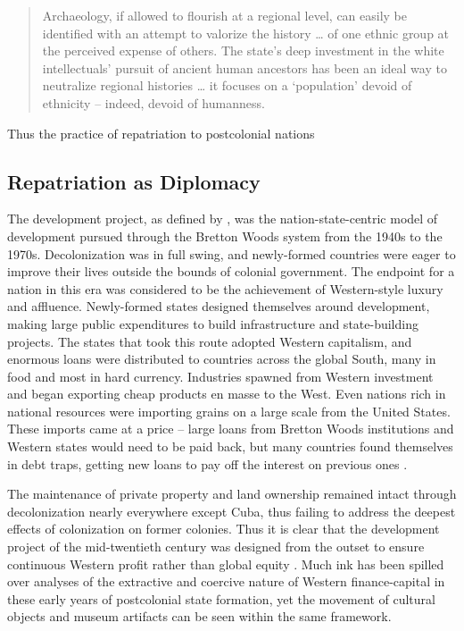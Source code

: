 \documentclass[american]{../../../coursework}
\begin{document}
\begin{quote}
    Archaeology, if allowed to flourish at a regional level, can easily be
    identified with an attempt to valorize the history … of one ethnic group
    at the perceived expense of others. The state's deep investment in the
    white intellectuals' pursuit of ancient human ancestors has been an ideal
    way to neutralize regional histories … it focuses on a `population' devoid
    of ethnicity -- indeed, devoid of humanness.
    
    \parencite[128-129]{Sch95}
\end{quote}

Thus the practice of repatriation to postcolonial nations 

\subsection{Repatriation as Diplomacy}

The development project, as defined by \textcite{McM04}, was the
nation-state-centric model of development pursued through the Bretton Woods
system from the 1940s to the 1970s. Decolonization was in full swing, and
newly-formed countries were eager to improve their lives outside the bounds of
colonial government. The endpoint for a nation in this era was considered to
be the achievement of Western-style luxury and affluence. Newly-formed states
designed themselves around development, making large public expenditures to
build infrastructure and state-building projects. The states that took this
route adopted Western capitalism, and enormous loans were distributed to
countries across the global South, many in food and most in hard currency.
Industries spawned from Western investment and began exporting cheap products
en masse to the West. Even nations rich in national resources were importing
grains on a large scale from the United States. These imports came at a price
-- large loans from Bretton Woods institutions and Western states would need
to be paid back, but many countries found themselves in debt traps, getting
new loans to pay off the interest on previous ones \parencite{McM04}.

The maintenance of private property and land ownership remained intact through
decolonization nearly everywhere except Cuba, thus failing to address the
deepest effects of colonization on former colonies. Thus it is clear that the
development project of the mid-twentieth century was designed from the outset
to ensure continuous Western profit rather than global equity
\parencite{Fra66}. Much ink has been spilled over analyses of the extractive
and coercive nature of Western finance-capital in these early years of
postcolonial state formation, yet the movement of cultural objects and museum
artifacts can be seen within the same framework.
\end{document}
